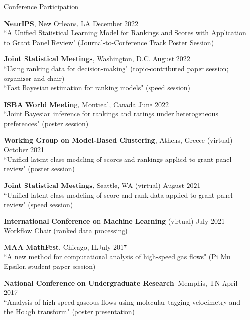 \documentclass{resume} %
\begin{document}
\begin{rSection}{Conference Participation}

\textbf{NeurIPS}, New Orleans, LA \hfill {December 2022}\\
``A Unified Statistical Learning Model for Rankings and Scores with Application to Grant Panel Review" (Journal-to-Conference Track Poster Session)

\textbf{Joint Statistical Meetings}, Washington, D.C. \hfill {August 2022}\\
``Using ranking data for decision-making" (topic-contributed paper session; organizer and chair)\\
``Fast Bayesian estimation for ranking models" (speed session)

\textbf{ISBA World Meeting}, Montreal, Canada \hfill {June 2022}\\
``Joint Bayesian inference for rankings and ratings under heterogeneous preferences" (poster session)

\textbf{Working Group on Model-Based Clustering}, Athens, Greece (virtual)  \hfill {October 2021}\\
``Unified latent class modeling of scores and rankings applied to grant panel review" (poster session)

\textbf{Joint Statistical Meetings}, Seattle, WA (virtual) \hfill {August 2021}\\
``Unified latent class modeling of score and rank data applied to grant panel review" (speed session)

\textbf{International Conference on Machine Learning} (virtual) \hfill {July 2021}\\
Workflow Chair (ranked data processing)

\textbf{MAA MathFest}, Chicago, IL\hfill {July 2017}\\
``A new method for computational analysis of high-speed gas flows" (Pi Mu Epsilon student paper session)

\textbf{National Conference on Undergraduate Research}, Memphis, TN \hfill {April 2017}\\
``Analysis of high-speed gaseous flows using molecular tagging velocimetry and the Hough transform" (poster presentation)
\end{rSection}
\end{document}
